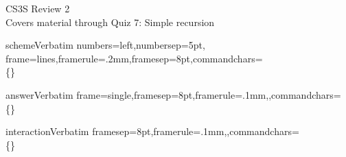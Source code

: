 \documentclass[pdftex,11pt]{article}
\begin{document}
\begin{center}
  \Huge{CS3S Review 2}\\
  \large Covers material through Quiz 7: Simple recursion
\end{center}

\DefineVerbatimEnvironment%
  {scheme}{Verbatim}
  {numbers=left,numbersep=5pt,
   frame=lines,framerule=.2mm,framesep=8pt,commandchars=\\\{\}}

\DefineVerbatimEnvironment%
  {answer}{Verbatim}
  {frame=single,framesep=8pt,framerule=.1mm,,commandchars=\\\{\}}

\DefineVerbatimEnvironment%
  {interaction}{Verbatim}
  {framesep=8pt,framerule=.1mm,,commandchars=\\\{\}}
\end{document}

